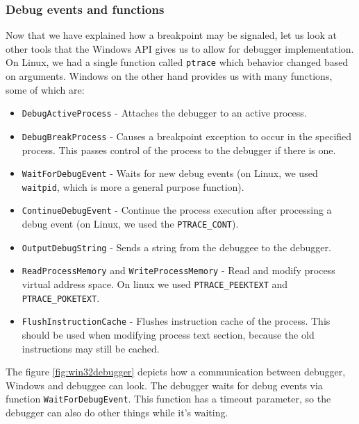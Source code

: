 \subsubsection{Debug events and functions}
Now that we have explained how a breakpoint may be signaled, let us look at
other tools that the Windows API gives us to allow for debugger implementation.
On Linux, we had a single function called \texttt{ptrace} which behavior
changed based on arguments. Windows on the other hand provides us with many
functions, some of which are:

\begin{itemize}
    \item \texttt{DebugActiveProcess} - Attaches the debugger to an
        active process.
    \item \texttt{DebugBreakProcess} - Causes a breakpoint exception to
        occur in the specified process. This passes control of the process to
        the debugger if there is one.
    \item \texttt{WaitForDebugEvent} - Waits for new debug events (on
        Linux, we used \texttt{waitpid}, which is more a general purpose
        function).
    \item \texttt{ContinueDebugEvent} - Continue the process execution
        after processing a debug event (on Linux, we used the
        \texttt{PTRACE\_CONT}).
    \item \texttt{OutputDebugString} - Sends a string from the debuggee
        to the debugger.
    \item \texttt{ReadProcessMemory} and
    \texttt{WriteProcessMemory} - Read and modify process virtual
        address space. On linux we used \texttt{PTRACE\_PEEKTEXT} and
        \texttt{PTRACE\_POKETEXT}.
    \item \texttt{FlushInstructionCache} - Flushes instruction cache of
        the process. This should be used when modifying process text section,
        because the old instructions may still be cached.
\end{itemize}

The figure \ref{fig:win32debugger} depicts how a communication between
debugger, Windows and debuggee can look. The debugger waits for debug events via
function \texttt{WaitForDebugEvent}. This function has a timeout
parameter, so the debugger can also do other things while it's waiting.

